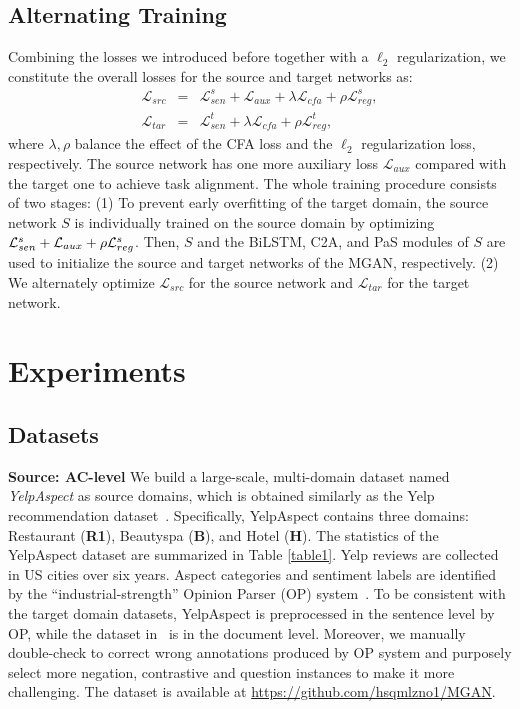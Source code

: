 \documentclass[letterpaper]{article} \usepackage{aaai19}  \usepackage{times}  \usepackage{latexsym}
\begin{document}
\subsection{Alternating Training}
Combining the losses we introduced before together with a $\ell_2$ regularization, we constitute the overall losses for the source and target networks as:
\begin{eqnarray}
{ \mathcal{L} }_{ src } &=& {\mathcal{L}}_{sen}^{s} + \mathcal{L}_{aux} +\lambda  { \mathcal{L} }_{ cfa } + \rho { \mathcal{ L } }_{ reg }^{s}, 
\label{eqn:src_loss}
\\
{ \mathcal{L} }_{ tar } &=& {\mathcal{L}}_{sen}^{t} + \lambda { \mathcal{L} }_{ cfa } +\rho { \mathcal{ L } }_{ reg }^{t}, 
\label{eqn:tgt_loss}
\end{eqnarray}
\noindent
where $\lambda, \rho$ balance the effect of the CFA loss and the $\ell_2$ regularization loss, respectively. The source network has one more auxiliary loss $\mathcal{L}_{aux}$ compared with the target one to achieve task alignment. The whole training procedure consists of two stages: (1) To prevent early overfitting of the target domain, the source network $S$ is individually trained on the source domain by optimizing $\small{{\mathcal{L}}_{sen}^{s}}+ \mathcal{L}_{aux}+ \rho { \mathcal{ L } }_{ reg }^{s}$. Then, $S$ and the BiLSTM, C2A, and PaS modules of $S$ are used to initialize the source and target networks of  the MGAN, respectively. (2) We alternately optimize ${ \mathcal{L} }_{ src }$ for the source network and ${ \mathcal{L} }_{ tar }$ for the target network.


\section{Experiments}

\subsection{Datasets}
\noindent \textbf{Source: AC-level}
We build a large-scale, multi-domain dataset named \emph{{YelpAspect}} as source domains, which is obtained similarly as the Yelp recommendation dataset~\cite{bauman2017aspect}. Specifically, YelpAspect contains three domains: Restaurant (\textbf{R1}), Beautyspa (\textbf{B}), and Hotel (\textbf{H}). The statistics of the YelpAspect dataset are summarized in Table \ref{table1}. Yelp reviews are collected in US cities over six years. Aspect categories and sentiment labels are identified by the ``industrial-strength'' Opinion Parser (OP) system~\cite{qiu2011opinion,liu2015sent}. To be consistent with the target domain datasets, YelpAspect is preprocessed in the sentence level by OP, while the dataset in~\cite{bauman2017aspect} is in the document level. Moreover, we manually double-check to correct wrong annotations produced by OP system and purposely select more negation, contrastive and question instances to make it more challenging. The dataset is available at \url{https://github.com/hsqmlzno1/MGAN}.
\end{document}

